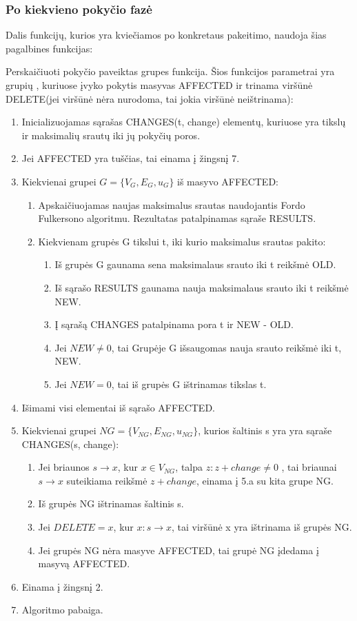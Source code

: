 \subsubsection{Po kiekvieno pokyčio fazė}

Dalis funkcijų, kurios yra kviečiamos po konkretaus pakeitimo, naudoja šias pagalbines funkcijas:

Perskaičiuoti pokyčio paveiktas grupes funkcija. Šios funkcijos parametrai yra grupių , kuriuose įvyko pokytis masyvas AFFECTED ir trinama viršūnė  DELETE(jei viršūnė nėra nurodoma, tai jokia viršūnė neištrinama):
\begin{enumerate}
	\item Inicializuojamas sąrašas CHANGES(t, change) elementų, kuriuose yra tikslų ir maksimalių srautų iki jų pokyčių poros.
	\item Jei AFFECTED yra tuščias, tai einama į žingsnį 7.
	\item Kiekvienai grupei $G=\{V_G, E_G, u_G\}$ iš masyvo AFFECTED:
	\begin{enumerate}
		\item Apskaičiuojamas naujas maksimalus srautas naudojantis Fordo Fulkersono algoritmu. Rezultatas patalpinamas sąraše RESULTS.
		\item Kiekvienam grupės G tikslui t, iki kurio maksimalus srautas pakito:
		\begin{enumerate}
			\item Iš grupės G gaunama sena maksimalaus srauto iki t reikšmė OLD.
			\item Iš sąrašo RESULTS gaunama nauja maksimalaus srauto iki t reikšmė NEW.
			\item Į sąrašą CHANGES patalpinama pora t ir NEW - OLD.
			\item Jei $NEW \neq 0$, tai Grupėje G išsaugomas nauja srauto reikšmė iki t, NEW.
			\item Jei $NEW = 0$, tai iš grupės G ištrinamas tikslas t.
		\end{enumerate}
	\end{enumerate}
	\item Išimami visi elementai iš sąrašo AFFECTED.
	\item Kiekvienai grupei $NG=\{V_{NG}, E_{NG}, u_{NG}\}$, kurios šaltinis s yra yra sąraše CHANGES(s, change):
	\begin{enumerate}
		\item Jei briaunos $s \rightarrow x$, kur $x \in V_{NG}$, talpa $z : z + change  \neq 0$ , tai briaunai $s \rightarrow x$ suteikiama reikšmė $z + change$, einama į 5.a su kita grupe NG.
		\item Iš grupės NG ištrinamas šaltinis s.
		\item Jei $DELETE  = x$, kur $x : s \rightarrow x$, tai viršūnė x yra ištrinama iš grupės NG.
		\item Jei grupės NG nėra masyve AFFECTED, tai grupė NG įdedama į masyvą AFFECTED.
	\end{enumerate}
	\item Einama į žingsnį  2.
	\item Algoritmo pabaiga. 
\end{enumerate}

